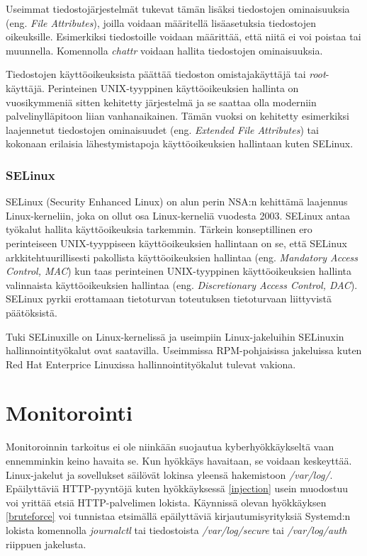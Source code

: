 Useimmat tiedostojärjestelmät tukevat tämän lisäksi tiedostojen ominaisuuksia (eng. \textit{File Attributes}), joilla voidaan määritellä lisäasetuksia tiedostojen oikeuksille. Esimerkiksi tiedostoille voidaan määrittää, että niitä ei voi poistaa tai muunnella. Komennolla \textit{chattr} voidaan hallita tiedostojen ominaisuuksia.

Tiedostojen käyttöoikeuksista päättää tiedoston omistajakäyttäjä tai \textit{root}-käyttäjä. Perinteinen UNIX-tyyppinen käyttöoikeuksien hallinta on vuosikymmeniä sitten kehitetty järjestelmä ja se saattaa olla moderniin palvelinylläpitoon liian vanhanaikainen. Tämän vuoksi on kehitetty esimerkiksi laajennetut tiedostojen ominaisuudet (eng. \textit{Extended File Attributes}) tai kokonaan erilaisia lähestymistapoja käyttöoikeuksien hallintaan kuten SELinux.~\cite{kalsi2018practical}

\subsubsection{SELinux}\label{selinux}
SELinux (Security Enhanced Linux) on alun perin NSA:n kehittämä laajennus Linux-kerneliin, joka on ollut osa Linux-kerneliä vuodesta 2003. SELinux antaa työkalut hallita käyttöoikeuksia tarkemmin. Tärkein konseptillinen ero perinteiseen UNIX-tyyppiseen käyttöoikeuksien hallintaan on se, että SELinux arkkitehtuurillisesti pakollista käyttöoikeuksien hallintaa (eng. \textit{Mandatory Access Control, MAC}) kun taas perinteinen UNIX-tyyppinen käyttöoikeuksien hallinta valinnaista käyttöoikeuksien hallintaa (eng. \textit{Discretionary Access Control, DAC}). SELinux pyrkii erottamaan tietoturvan toteutuksen tietoturvaan liittyvistä päätöksistä.

Tuki SELinuxille on Linux-kernelissä ja useimpiin Linux-jakeluihin SELinuxin hallinnointityökalut ovat saatavilla. Useimmissa RPM-pohjaisissa jakeluissa kuten Red Hat Enterprice Linuxissa hallinnointityökalut tulevat vakiona.~\cite{selinux}

\section{Monitorointi}\label{monitorointi}
Monitoroinnin tarkoitus ei ole niinkään suojautua kyberhyökkäykseltä vaan ennemminkin keino havaita se. Kun hyökkäys havaitaan, se voidaan keskeyttää. Linux-jakelut ja sovellukset säilövät lokinsa yleensä hakemistoon \textit{/var/log/}. Epäilyttäviä HTTP-pyyntöjä kuten hyökkäyksessä \ref{injection} usein muodostuu voi yrittää etsiä HTTP-palvelimen lokista. Käynnissä olevan hyökkäyksen \ref{bruteforce} voi tunnistaa etsimällä epäilyttäviä kirjautumisyrityksiä Systemd:n lokista komennolla \textit{journalctl} tai tiedostoista \textit{/var/log/secure} tai \textit{/var/log/auth} riippuen jakelusta. 

